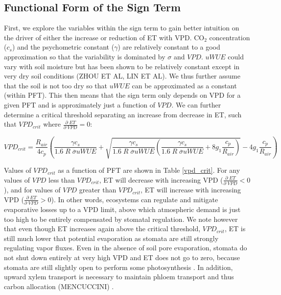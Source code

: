\documentclass[draft,linenumbers]{agujournal}
\begin{document}
\subsection{Functional Form of the Sign Term}
\label{sign_term}
First, we explore the variables within the sign term to gain better intuition on the driver of either the increase or reduction of ET with VPD. CO$_2$ concentration ($c_s$) and the psychometric constant ($\gamma$) are relatively constant to a good approximation so that the variability is dominated by $\sigma$ and $VPD$. $uWUE$ could vary with soil moisture but has been shown to be relatively constant except in very dry soil conditions  (ZHOU ET AL, LIN ET AL). We thus further assume that the soil is not too dry so that $uWUE$ can be approximated as a constant (within PFT). This then means that the sign term only depends on VPD for a given PFT and is approximately just a function of $VPD$. We can further determine a critical threshold separating an increase from decrease in ET, such that $VPD_{crit}$ where $\frac{\partial \; ET}{\partial \; VPD} = 0$:

\begin{linenomath*}
  \begin{equation}
VPD_{crit} = \frac{R_{air}}{4 c_p} \left( \frac{\gamma c_s}{1.6\; R \; \overline{\sigma} uWUE} + \sqrt{\frac{\gamma c_s}{1.6\; R \; \overline{\sigma} uWUE}\left( \frac{\gamma c_s}{1.6\; R \; \overline{\sigma} uWUE} + 8 g_1 \frac{c_p}{R_{air}}\right)} - 4 g_1 \frac{c_p}{R_{air}} \right)
\label{vpd_min_et}
  \end{equation}
\end{linenomath*}

Values of $VPD_{crit}$ as a function of PFT are shown in Table \ref{vpd_crit}. For any values of $VPD$ less than $VPD_{crit}$, ET will decrease with increasing VPD ($\frac{\partial \; ET}{\partial \; VPD} < 0$), and for values of $VPD$ greater than $VPD_{crit}$, ET will increase with increasing VPD ($\frac{\partial \; ET}{\partial \; VPD} > 0$). In other words, ecosystems can regulate and mitigate evaporative losses up to a VPD limit, above which atmospheric demand is just too high to be entirely compensated by stomatal regulation. We note however that even though ET increases again above the critical threshold, $VPD_{crit}$, ET is still much lower that potential evaporation as stomata are still strongly regulating vapor fluxes. Even in the absence of soil pore evaporation, stomata do not shut down entirely at very high VPD and ET does not go to zero, because stomata are still slightly open to perform some photosynthesis \citep{Ball_1987, Leuning_1990, MEDLYN_2011}. In addition, upward xylem transport is necessary to maintain phloem transport and thus carbon allocation (MENCUCCINI) .
\end{document}
